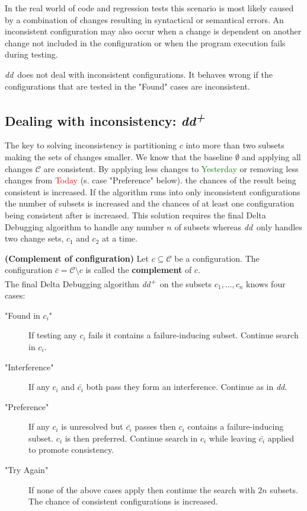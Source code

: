 \documentclass[a4paper,UKenglish]{lipics-v2018}
\newcommand{\dd}[0]{\textit{dd}}
\newcommand{\ddp}{\textit{dd\textsuperscript{+}}}
\newcommand{\green}[1]{\textcolor{green}{#1}}
\newcommand{\red}[1]{\textcolor{red}{#1}}
\newcommand{\yd}[0]{\green{Yesterday} }
\newcommand{\td}[0]{\red{Today} }
\newcommand{\C}[0]{\ensuremath{\mathcal{C}}}
\newcommand{\defsub}[1]{\textbf{(#1)} }
\begin{document}
In the real world of code and regression tests this scenario is most likely caused by a combination of changes resulting in syntactical or semantical errors. An inconsistent configuration may also occur when a change is dependent on another change not included in the configuration or when the program execution fails during testing. 

\dd\ does not deal with inconsistent configurations. It behaves wrong if the configurations that are tested in the "Found" cases are inconsistent.


\subsection{Dealing with inconsistency: \ddp}

The key to solving inconsistency is partitioning $c$ into more than two subsets making the sets of changes smaller. We know that the baseline $\emptyset$ and applying all changes $\C$ are consistent. By applying less changes to \yd or removing less changes from \td (s. case "Preference" below). the chances of the result being consistent is increased. If the algorithm runs into only inconsistent configurations the number of subsets is increased and the chances of at least one configuration being consistent after is increased. This solution requires the final Delta Debugging algorithm to handle any number $n$ of subsets whereas \dd\ only handles two change sets, $c_1$ and $c_2$ at a time.

 \defsub{Complement of configuration} Let $c \subseteq \C$ be a configuration. The configuration $\bar{c} = \C \setminus c$ is called the \textbf{complement} of $c$.\\

The final Delta Debugging algorithm \ddp\ on the subsets $c_1, \dots, c_n$ knows four cases:\\
\begin{description}
	\item["Found in $c_i$"] If testing any $c_i$ fails it contains a failure-inducing subset. Continue search in $c_i$.
	\item["Interference"] If any $c_i$ and $\bar{c_i}$ both pass they form an interference. Continue as in \dd.
	\item["Preference"] If any $c_i$ is unresolved but $\bar{c_i}$ passes then $c_i$ contains a failure-inducing subset. $c_i$ is then preferred. Continue search in $c_i$ while leaving $\bar{c_i}$ applied to promote consistency.
	\item["Try Again"] If none of the above cases apply then continue the search with $2n$ subsets. The chance of consistent configurations is increased.
\end{description}
\end{document}

